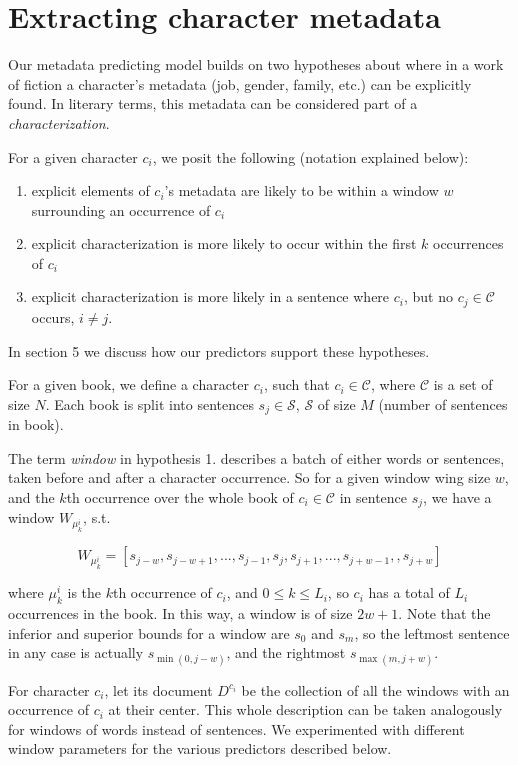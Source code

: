 \section{Extracting character metadata} \label{sec:metadata}
Our metadata predicting model builds on two hypotheses about where in a work of fiction a character's metadata (job, gender, family, etc.) can be explicitly found. In literary terms, this metadata can be considered part of a \textit{characterization}. 

For a given character $c_i$, we posit the following (notation explained below):
\begin{enumerate}
\item explicit elements of $c_i$'s metadata are likely to be within a window $w$ surrounding an occurrence of $c_i$
\item explicit characterization is more likely to occur within the first $k$ occurrences of $c_i$
\item explicit characterization is more likely in a sentence where $c_i$, but no $c_j \in \mathcal{C}$ occurs, $i \neq j$.
\end{enumerate}

In section 5 we discuss how our predictors support these hypotheses.

For a given book, we define a character $c_i$, such that $c_i \in \mathcal{C}$, where $\mathcal{C}$ is a set of size $N$. Each book is split into sentences $s_j \in \mathcal{S}$, $\mathcal{S}$ of size $M$ (number of sentences in book). 

The term \textit{window} in hypothesis 1. describes a batch of either words or sentences, taken before and after a character occurrence. So for a given window wing size $w$, and the $k$th occurrence over the whole book of $c_i \in \mathcal{C}$  in sentence $s_j$, we have a window $W_{\mu^i_k}$, s.t. 

\begin{equation}
W_{\mu^i_k} = [s_{j-w}, s_{j-w+1}, ...,  s_{j-1}, s_{j}, s_{j+1}, ..., s_{j+w-1}, , s_{j+w}]
\end{equation}

where $\mu^i_k$ is the $k$th occurrence of $c_i$, and $0 \leq k \leq L_i$, so $c_i$ has a total of $L_i$ occurrences in the book. In this way, a window is of size $2w + 1$. Note that the inferior and superior bounds for a window are $s_0$ and $s_m$, so the leftmost sentence in any case is actually $s_{\min(0, j-w)}$, and the rightmost $s_{\max(m, j+w)}$. 

For character $c_i$, let its document $D^{c_i}$ be the collection of all the windows with an occurrence of $c_i$ at their center. This whole description can be taken analogously for windows of words instead of sentences. We experimented with different window parameters for the various predictors described below. 

